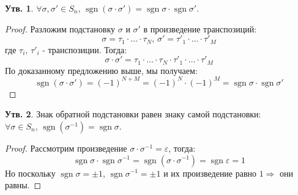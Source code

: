 \documentclass[12pt]{article}
\newcommand{\VE}{\varepsilon}
\theoremstyle{definition}
\newtheorem{prop}{Утв.}
\DeclareMathOperator{\sgn}{sgn}
\begin{document}
\begin{prop}
	$\forall \sigma,\sigma' \in S_n, \, \sgn{(\sigma{\cdot}\sigma')} = \sgn{\sigma}{\cdot}\sgn{\sigma'}$.
\end{prop}
\begin{proof}
	Разложим подстановку $\sigma$ и $\sigma'$ в произведение транспозиций:
	$$
		\sigma = \tau_1{\cdot}\dotsc{\cdot}\tau_N, \, \sigma' = \tau'_1{\cdot}\dotsc{\cdot}\tau'_M
	$$
	где $\tau_i, \, \tau'_i$ - транспозиции. Тогда:
	$$
		\sigma{\cdot}\sigma' = \tau_1{\cdot}\dotsc{\cdot}\tau_N{\cdot}\tau'_1{\cdot}\dotsc{\cdot}\tau'_M
	$$
	По доказанному предложению выше, мы получаем:
	$$
		\sgn{(\sigma{\cdot}\sigma')} = (-1)^{N + M} = (-1)^N{\cdot}(-1)^{M} = \sgn{\sigma}{\cdot}\sgn{\sigma'}
	$$
\end{proof}
\begin{prop}
	Знак обратной подстановки равен знаку самой подстановки: $\forall \sigma \in S_n, \, \sgn{(\sigma^{-1})} = \sgn{\sigma}$.
\end{prop}
\begin{proof}
	Рассмотрим произведение $\sigma{\cdot}\sigma^{-1} = \VE$, тогда:
	$$
		\sgn{\sigma}{\cdot}\sgn{\sigma^{-1}} = \sgn{(\sigma{\cdot}\sigma^{-1})} = \sgn{\VE} = 1 
	$$
	Но поскольку $\sgn{\sigma} = \pm1$, $\sgn{\sigma^{-1}} = \pm1$ и их произведение равно $1 \Rightarrow$ они равны.
\end{proof}

\newpage
\end{document}
